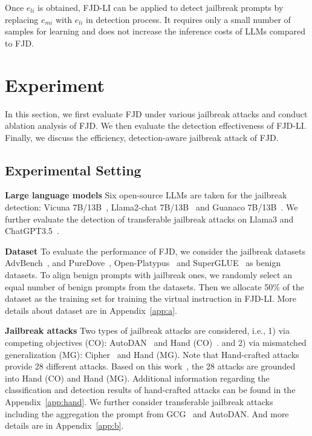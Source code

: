 \documentclass{article}
\begin{document}
Once $e_{li}$ is obtained, FJD-LI can be applied to detect jailbreak prompts by replacing $e_{mi}$ with $e_{li}$ in detection process. It requires only a small number of samples for learning and does not increase the inference costs of LLMs compared to FJD.


\section{Experiment}


In this section, we first evaluate FJD under various jailbreak attacks and conduct ablation analysis of FJD. We then evaluate the detection effectiveness of FJD-LI. Finally, we discuss the efficiency, detection-aware jailbreak attack of FJD.


\subsection{Experimental Setting}\label{sec:es}


\textbf{Large language models} Six open-source LLMs are taken for the jailbreak detection: Vicuna 7B/13B~\citep{chiang2023vicuna}, Llama2-chat 7B/13B~\citep{touvron2023llama} and Guanaco 7B/13B~\citep{dettmers2024qlora}. We further evaluate the detection of transferable jailbreak
attacks on Llama3 and ChatGPT3.5~\citep{achiam2023gpt}.

\textbf{Dataset} To evaluate the performance of FJD, we consider the jailbreak datasets AdvBench~\citep{zou2023universal}, and PureDove~\citep{daniele2023amplify-instruct}, Open-Platypus~\citep{lee2023platypus} and SuperGLUE~\citep{wang2019superglue} as benign datasets. To align benign prompts with jailbreak ones, we randomly select an equal number of benign prompts from the datasets. Then we allocate 50\% of the dataset as the training set for training the virtual instruction in FJD-LI. More details about dataset are in Appendix~\ref{app:a}.

\textbf{Jailbreak attacks} Two types of jailbreak attacks are considered, i.e., 1) via competing objectives (CO): AutoDAN~\citep{liu2023autodan} and Hand (CO)~\citep{chen2024red}. and 2) via mismatched generalization (MG): Cipher~\citep{yuan2023gpt} and Hand (MG). Note that Hand-crafted attacks provide 28 different attacks. Based on this work~\citep{wei2024jailbroken}, the 28 attacks are grounded into Hand (CO) and Hand (MG). Additional information regarding the classification and detection results of hand-crafted attacks can be found in the Appendix~\ref{app:hand}. We further consider transferable jailbreak attacks including the aggregation the prompt from GCG~\citep{zou2023universal} and AutoDAN. And more details are in Appendix~\ref{app:b}.
\end{document}
